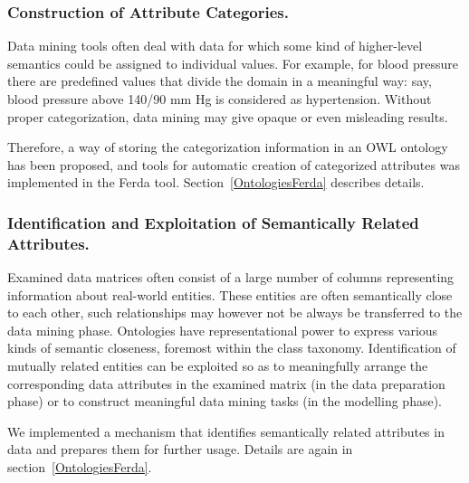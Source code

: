\subsubsection{Construction of Attribute Categories.}

Data mining tools often deal with data for which some kind of higher-level semantics could be assigned to individual values.
For example, for blood pressure there are predefined values that divide the domain in a meaningful way: say, blood pressure above 140/90 mm Hg is considered as hypertension. 
Without proper categorization, data mining may give opaque or even misleading results.

Therefore, a way of storing the categorization information in an OWL ontology has been proposed, and tools for automatic creation of categorized attributes was implemented in the Ferda tool. 
Section~\ref{OntologiesFerda} describes details.

\subsubsection{Identification and Exploitation of Semantically Related Attributes.}

Examined data matrices often consist of a large number of columns representing information about real-world entities. 
These entities are often semantically close to each other, such relationships may however not be always be transferred to the data mining phase.
Ontologies have representational power to express various kinds of semantic closeness, foremost within the class taxonomy. 
Identification of mutually related entities can be exploited so as to meaningfully arrange the corresponding data attributes in the examined matrix (in the data preparation phase) or to construct meaningful data mining tasks (in the modelling phase). 

We implemented a mechanism that identifies semantically related attributes in data and prepares them for further usage. 
Details are again in section~\ref{OntologiesFerda}.


